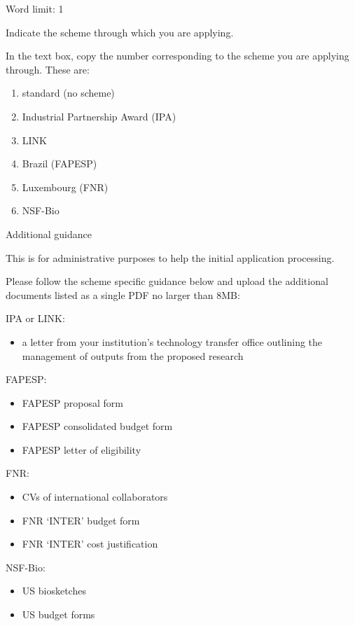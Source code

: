 
\begin{instruction}
Word limit: 1

Indicate the scheme through which you are applying.

In the text box, copy the number corresponding to the scheme you are applying
through. These are:

\begin{enumerate}
    \item standard (no scheme)
    \item Industrial Partnership Award (IPA)
    \item LINK
    \item Brazil (FAPESP)
    \item Luxembourg (FNR)
    \item NSF-Bio
\end{enumerate}

Additional guidance

This is for administrative purposes to help the initial application processing.

Please follow the scheme specific guidance below and upload the additional
documents listed as a single PDF no larger than 8MB:

IPA or LINK:

\begin{itemize}

    \item a letter from your institution’s technology transfer office outlining the
management of outputs from the proposed research

\end{itemize}

FAPESP:

\begin{itemize}

    \item FAPESP proposal form
    \item FAPESP consolidated budget form
    \item FAPESP letter of eligibility

\end{itemize}

FNR:

\begin{itemize}

    \item CVs of international collaborators
    \item FNR ‘INTER’ budget form
    \item FNR ‘INTER’ cost justification

\end{itemize}

NSF-Bio:

\begin{itemize}

    \item US biosketches
    \item US budget forms

\end{itemize}
\end{instruction}
